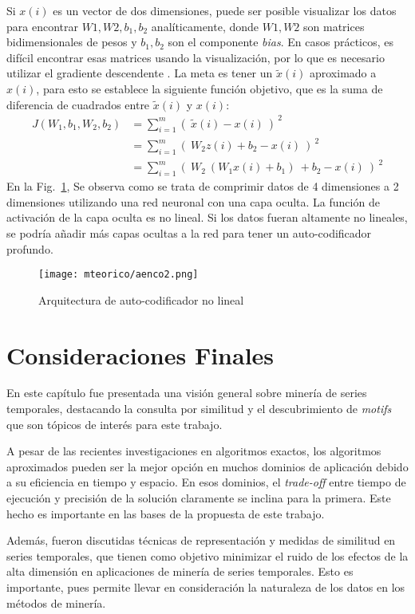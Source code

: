     Si $x(i)$ es un vector de dos dimensiones, puede ser posible visualizar los datos para encontrar $W1, W2, b_1, b_2$ analíticamente, donde $W1, W2$ son matrices bidimensionales de pesos y $b_1, b_2$ son el componente \textit{bias}. En casos prácticos, es difícil encontrar esas matrices usando la visualización, por lo que es necesario utilizar el gradiente descendente \cite{stochastic-gradient-tricks}. La meta es tener un $\tilde{x}(i)$ aproximado a $x(i)$, para esto se establece la siguiente función objetivo, que es la suma de diferencia de cuadrados entre $\tilde{x}(i)$ y $x(i)$:
    \begin{equation}
    \begin{aligned}
     J(W_1,b_1,W_2,b_2) & = \sum_{i=1}^m\left(\ \tilde{x}(i)-x(i)\ \right )^{\ 2} \\
      & = \sum_{i=1}^m\left(\ W_2z(i) + b_2-x(i)\ \right )^{\ 2}\\
     & = \sum_{i=1}^m\left(\ W_2 \ (W_1x(i)+b_1) \ + b_2-x(i)\ \right )^{\ 2}
    \end{aligned}
    \end{equation}
    En la Fig.~\ref{fig:aenco2}, Se observa como se trata de comprimir datos de 4 dimensiones a 2 dimensiones utilizando una red neuronal con una capa oculta. La función de activación de la capa oculta es no lineal. Si los datos fueran altamente no lineales, se podría añadir más capas ocultas a la red para tener un auto-codificador profundo.
    \begin{figure}[htp]
        \centering
        \texttt{[image: mteorico/aenco2.png]}
        \caption{Arquitectura de auto-codificador no lineal}
        \label{fig:aenco2}
    \end{figure}

  

\section{Consideraciones Finales}\label{sec:consideraciones-finales}

En este capítulo fue presentada una visión general sobre minería de series \mbox{temporales}, destacando la consulta por similitud y el descubrimiento de \textit{motifs}  que son tópicos de interés para este trabajo.

A pesar de las recientes investigaciones en algoritmos exactos, los algoritmos aproximados pueden ser la mejor opción en muchos dominios de aplicación debido a su eficiencia en tiempo y espacio. En esos dominios, el \textit{trade-off} entre tiempo de ejecución y precisión de la solución claramente se inclina para la primera. Este hecho es importante en las bases de la propuesta de este trabajo.

Además, fueron discutidas técnicas de representación y medidas de similitud en series temporales, que tienen como objetivo minimizar el ruido de los efectos de la alta dimensión en aplicaciones de minería de series temporales. Esto es importante, pues permite llevar en consideración la naturaleza de los datos en los métodos de minería.





